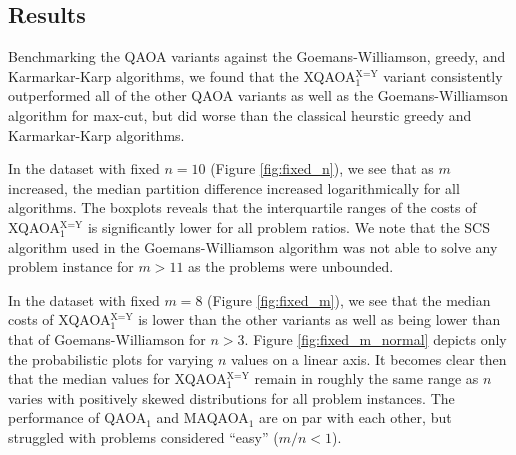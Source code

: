 \subsection{Results}

Benchmarking the QAOA variants against the Goemans-Williamson, greedy, and Karmarkar-Karp algorithms, we found that the XQAOA$_1^\text{X=Y}$ variant consistently outperformed all of the other QAOA variants as well as the Goemans-Williamson algorithm for max-cut, but did worse than the classical heurstic greedy and Karmarkar-Karp algorithms. 

In the dataset with fixed $n=10$ (Figure \ref{fig:fixed_n}), we see that as $m$ increased, the median partition difference increased logarithmically for all algorithms. The boxplots reveals that the interquartile ranges of the costs of XQAOA$_1^\text{X=Y}$ is significantly lower for all problem ratios. We note that the SCS algorithm used in the Goemans-Williamson algorithm was not able to solve any problem instance for $m>11$ as the problems were unbounded.

In the dataset with fixed $m=8$ (Figure \ref{fig:fixed_m}), we see that the median costs of XQAOA$_1^\text{X=Y}$ is lower than the other variants as well as being lower than that of Goemans-Williamson for $n>3$. Figure \ref{fig:fixed_m_normal} depicts only the probabilistic plots for varying $n$ values on a linear axis. It becomes clear then that the median values for XQAOA$_1^\text{X=Y}$ remain in roughly the same range as $n$ varies with positively skewed distributions for all problem instances. The performance of QAOA$_1$ and MAQAOA$_1$ are on par with each other, but struggled with problems considered ``easy'' ($m/n <1$).








